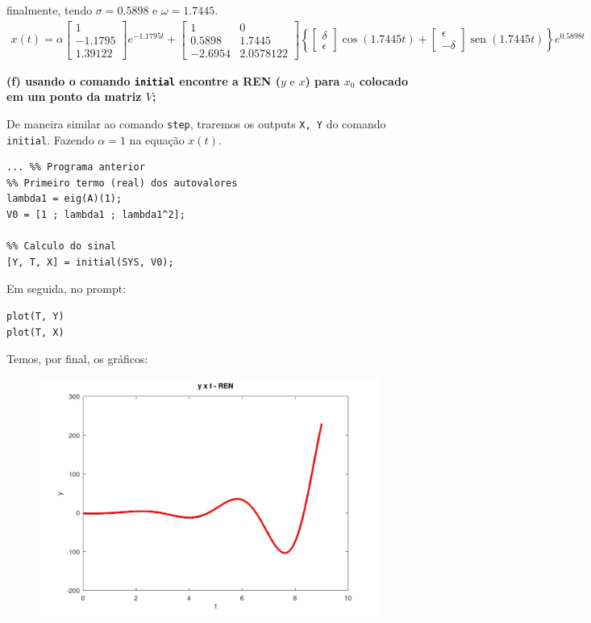 \documentclass[11pt]{article}
\DeclareMathOperator{\sen}{sen}
\begin{document}
finalmente, tendo $\sigma = 0.5898$ e $\omega = 1.7445$.
\begin{align*}
  x(t) = \alpha
  \begin{bmatrix}
    1\\
    -1.1795\\
    1.39122
  \end{bmatrix}
  e^{-1.1795 t} + 
  \begin{bmatrix}
    1 & 0\\
    0.5898 & 1.7445\\
    -2.6954& 2.0578122
  \end{bmatrix}
  \left\{
    \begin{bmatrix}
      \delta\\
      \epsilon
    \end{bmatrix}
    \cos(1.7445 t) +
    \begin{bmatrix}
      \epsilon\\
      -\delta
    \end{bmatrix}
    \sen(1.7445 t)
  \right\}
  e^{0.5898 t}
\end{align*}

\textbf{(f) usando o comando \texttt{initial} encontre a REN ($y \text{ e } x$) para $x_0$ colocado em um ponto da matriz $V$;}

De maneira similar ao comando \texttt{step}, traremos os outputs \texttt{X, Y} do comando \texttt{initial}. Fazendo $\alpha = 1$ na equação $x(t)$.
\begin{verbatim}
... %% Programa anterior
%% Primeiro termo (real) dos autovalores
lambda1 = eig(A)(1);
V0 = [1 ; lambda1 ; lambda1^2];

%% Calculo do sinal
[Y, T, X] = initial(SYS, V0);
\end{verbatim}

Em seguida, no prompt:
\begin{verbatim}
plot(T, Y)
plot(T, X)
\end{verbatim}

Temos, por final, os gráficos:
\begin{figure}[h]
  \includegraphics[scale=0.3]{plot1f1.jpg}
  \centering
\end{figure}
\end{document}
